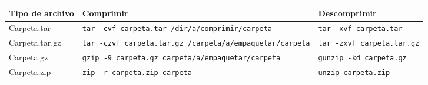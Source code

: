 \documentclass[
  spanish,
  12pt,
  letterpaper,
  DIV=11,
  numbers=noendperiod]{scrreprt}
\newcounter{none} %
\begin{document}
{\def\LTcaptype{none} %
\begin{longtable}[]{@{}
  >{\raggedright\arraybackslash}p{}
  >{\raggedright\arraybackslash}p{}
  >{\raggedright\arraybackslash}p{}@{}}
\toprule\noalign{}
\begin{minipage}[b]{\linewidth}\raggedright
Tipo de archivo
\end{minipage} & \begin{minipage}[b]{\linewidth}\raggedright
Comprimir
\end{minipage} & \begin{minipage}[b]{\linewidth}\raggedright
Descomprimir
\end{minipage} \\
\midrule\noalign{}
\endhead
\bottomrule\noalign{}
\endlastfoot
Carpeta.tar & \texttt{tar\ -cvf\ carpeta.tar\ /dir/a/comprimir/carpeta}
& \texttt{tar\ -xvf\ carpeta.tar} \\
Carpeta.tar.gz &
\texttt{tar\ -czvf\ carpeta.tar.gz\ /carpeta/a/empaquetar/carpeta} &
\texttt{tar\ -zxvf\ carpeta.tar.gz} \\
Carpeta.gz & \texttt{gzip\ -9\ carpeta.gz\ carpeta/a/empaquetar/carpeta}
& \texttt{gunzip\ -kd\ carpeta.gz} \\
Carpeta.zip & \texttt{zip\ -r\ carpeta.zip\ carpeta} &
\texttt{unzip\ carpeta.zip} \\
\end{longtable}
}
\end{document}
